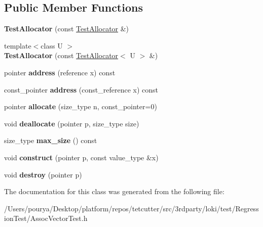 \subsection*{Public Member Functions}
\begin{DoxyCompactItemize}
\item 
\hypertarget{classTestAllocator_a824331facdfdf60ceabb4a54c8f71072}{}{\bfseries Test\+Allocator} (const \hyperlink{classTestAllocator}{Test\+Allocator} \&)\label{classTestAllocator_a824331facdfdf60ceabb4a54c8f71072}

\item 
\hypertarget{classTestAllocator_a295e5373fcff81cf97f1faf228b04f79}{}{\footnotesize template$<$class U $>$ }\\{\bfseries Test\+Allocator} (const \hyperlink{classTestAllocator}{Test\+Allocator}$<$ U $>$ \&)\label{classTestAllocator_a295e5373fcff81cf97f1faf228b04f79}

\item 
\hypertarget{classTestAllocator_a4c67edc9a76f216975cf858fdba2e297}{}pointer {\bfseries address} (reference x) const \label{classTestAllocator_a4c67edc9a76f216975cf858fdba2e297}

\item 
\hypertarget{classTestAllocator_adfeeaade7528f7769669f957c6b99032}{}const\+\_\+pointer {\bfseries address} (const\+\_\+reference x) const \label{classTestAllocator_adfeeaade7528f7769669f957c6b99032}

\item 
\hypertarget{classTestAllocator_a80730e70f906aaaa098d9c308b9d06d2}{}pointer {\bfseries allocate} (size\+\_\+type n, const\+\_\+pointer=0)\label{classTestAllocator_a80730e70f906aaaa098d9c308b9d06d2}

\item 
\hypertarget{classTestAllocator_aca2d96fd685e8ee964c62e0e37ab1304}{}void {\bfseries deallocate} (pointer p, size\+\_\+type size)\label{classTestAllocator_aca2d96fd685e8ee964c62e0e37ab1304}

\item 
\hypertarget{classTestAllocator_a2124f4bb6d52dcc0d1c95599fc4da3b3}{}size\+\_\+type {\bfseries max\+\_\+size} () const \label{classTestAllocator_a2124f4bb6d52dcc0d1c95599fc4da3b3}

\item 
\hypertarget{classTestAllocator_ae8190d1a9c8e58e8880138de0d685fc3}{}void {\bfseries construct} (pointer p, const value\+\_\+type \&x)\label{classTestAllocator_ae8190d1a9c8e58e8880138de0d685fc3}

\item 
\hypertarget{classTestAllocator_aee73981ee51bd2865438613eb79c3240}{}void {\bfseries destroy} (pointer p)\label{classTestAllocator_aee73981ee51bd2865438613eb79c3240}

\end{DoxyCompactItemize}


The documentation for this class was generated from the following file\+:\begin{DoxyCompactItemize}
\item 
/\+Users/pourya/\+Desktop/platform/repos/tetcutter/src/3rdparty/loki/test/\+Regression\+Test/Assoc\+Vector\+Test.\+h\end{DoxyCompactItemize}
